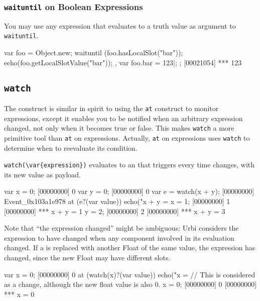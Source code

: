 \subsubsection{\lstinline{waituntil} on Boolean Expressions}

You may use any expression that evaluates to a truth value as argument
to \lstinline{waituntil}.

\begin{urbiscript}
{
  var foo = Object.new;
  {
    waituntil (foo.hasLocalSlot("bar"));
    echo(foo.getLocalSlotValue("bar"));
  },
  var foo.bar = 123|;
};
[00021054] *** 123
\end{urbiscript}

\subsection{\lstinline{watch}}
\label{sec:lang:watch}


The  construct is similar in spirit to using the
\lstinline{at} construct to monitor expressions, except it enables you to be
notified when an arbitrary expression changed, not only when it becomes true
or false. This makes \lstinline{watch} a more primitive tool than
\lstinline{at} on expressions.  Actually, \lstinline{at} on expressions uses
\lstinline{watch} to determine when to reevaluate its condition.

\lstinline|watch(\var{expression})| evaluates to an  that
triggers every time  changes, with its new value as payload.

\begin{urbiscript}[firstnumber=1]
var x = 0;
[00000000] 0
var y = 0;
[00000000] 0
var e = watch(x + y);
[00000000] Event_0x103a1e978
at (e?(var value))
  echo("x + y = %
x = 1;
[00000000] 1
[00000000] *** x + y = 1
y = 2;
[00000000] 2
[00000000] *** x + y = 3
\end{urbiscript}

Note that ``the expression changed'' might be ambiguous: Urbi considers the
expression to have changed when any component involved in its evaluation
changed.  If a  is replaced with another Float of the same
value, the expression has changed, since the new Float may have different
slots.

\begin{urbiscript}[firstnumber=1]
var x = 0;
[00000000] 0
at (watch(x)?(var value))
  echo("x = %
// This is considered as a change, although the new float value is also 0.
x = 0;
[00000000] 0
[00000000] *** x = 0
\end{urbiscript}

